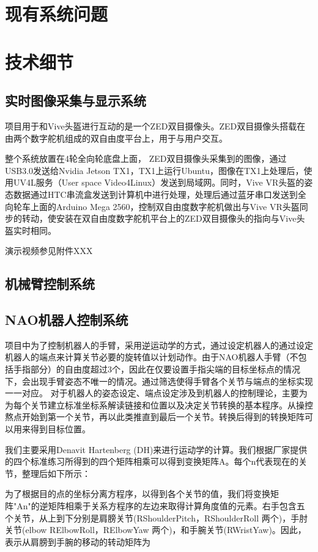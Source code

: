\chapter{现有系统问题}

\chapter{技术细节}

\section{实时图像采集与显示系统}
项目用于和Vive头盔进行互动的是一个ZED双目摄像头。ZED双目摄像头搭载在由两个数字舵机组成的双自由度平台上，用于与用户交互。

整个系统放置在4轮全向轮底盘上面， ZED双目摄像头采集到的图像，通过USB3.0发送给Nvidia Jetson TX1，TX1上运行Ubuntu，图像在TX1上处理后，使用UV4L服务（User space Video4Linux）发送到局域网。同时，Vive VR头盔的姿态数据通过HTC串流盒发送到计算机中进行处理，处理后通过蓝牙串口发送到全向轮车上面的Arduino Mega 2560，控制双自由度数字舵机做出与Vive VR头盔同步的转动，使安装在双自由度数字舵机平台上的ZED双目摄像头的指向与Vive头盔实时相同。

演示视频参见附件XXX

\section{机械臂控制系统}

\section{NAO机器人控制系统}
项目中为了控制机器人的手臂，采用逆运动学的方式，通过设定机器人的通过设定机器人的端点来计算关节必要的旋转值以计划动作。由于NAO机器人手臂（不包括手指部分）的自由度超过3个，因此在仅要设置手指尖端的目标坐标点的情况下，会出现手臂姿态不唯一的情况。通过筛选使得手臂各个关节与端点的坐标实现一一对应。
对于机器人的姿态设定、端点设定涉及到机器人的控制理论，主要为为每个关节建立标准坐标系解读链接和位置以及决定关节转换的基本程序。从操控熬点开始到第一个关节，再以此类推直到最后一个关节。转换后得到的转换矩阵可以用来得到目标位置。

我们主要采用Denavit Hartenberg (DH)来进行运动学的计算。我们根据厂家提供的四个标准练习所得到的四个矩阵相乘可以得到变换矩阵A。每个n代表现在的关节，整理后如下所示：

为了根据目的点的坐标分离方程序，以得到各个关节的值，我们将变换矩阵"An"的逆矩阵相乘于关系方程序的左边来取得计算角度值的元素。右手包含五个关节，从上到下分别是肩膀关节(RShoulderPitch，RShoulderRoll 两个)，手肘关节(elbow RElbowRoll，RElbowYaw 两个)，和手腕关节(RWristYaw)。因此，表示从肩膀到手腕的移动的转动矩阵为

